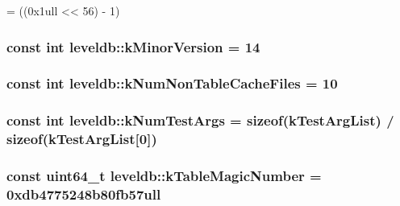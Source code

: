 \begin{DoxyCode}
=
    ((0x1ull << 56) - 1)
\end{DoxyCode}
\hypertarget{namespaceleveldb_afba0124470c60dd33b9d82838f40fc04}{
\subsubsection[{k\-Minor\-Version}]{\setlength{\rightskip}{0pt plus 5cm}const int leveldb\-::k\-Minor\-Version = 14\hspace{0.3cm}{\ttfamily [static]}}}\label{namespaceleveldb_afba0124470c60dd33b9d82838f40fc04}
\hypertarget{namespaceleveldb_a550686b2c442f4c3011d68dd12c38662}{
\subsubsection[{k\-Num\-Non\-Table\-Cache\-Files}]{\setlength{\rightskip}{0pt plus 5cm}const int leveldb\-::k\-Num\-Non\-Table\-Cache\-Files = 10}}\label{namespaceleveldb_a550686b2c442f4c3011d68dd12c38662}
\hypertarget{namespaceleveldb_a0bc857a7e9baff42f61503688957b6f5}{
\subsubsection[{k\-Num\-Test\-Args}]{\setlength{\rightskip}{0pt plus 5cm}const int leveldb\-::k\-Num\-Test\-Args = sizeof({\bf k\-Test\-Arg\-List}) / sizeof({\bf k\-Test\-Arg\-List}\mbox{[}0\mbox{]})\hspace{0.3cm}{\ttfamily [static]}}}\label{namespaceleveldb_a0bc857a7e9baff42f61503688957b6f5}
\hypertarget{namespaceleveldb_a4ea4fa6917989c12324b715f1b3069f8}{
\subsubsection[{k\-Table\-Magic\-Number}]{\setlength{\rightskip}{0pt plus 5cm}const {\bf uint64\-\_\-t} leveldb\-::k\-Table\-Magic\-Number = 0xdb4775248b80fb57ull\hspace{0.3cm}{\ttfamily [static]}}}\label{namespaceleveldb_a4ea4fa6917989c12324b715f1b3069f8}
